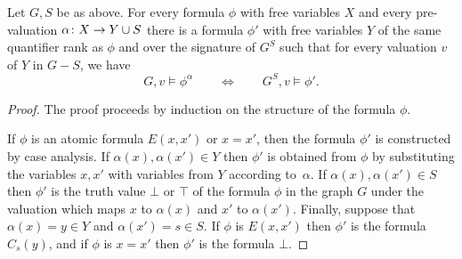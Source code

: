 \begin{lemma}\label{lem:remove-s}Let $G,S$ be as above.	
For every formula $\phi$ with free variables $X$ and every pre-valuation $\alpha\colon X\to Y\cup S$
there is a formula $\phi'$ with free variables $Y$
of the same quantifier rank as $\phi$ and over the signature of $G^S$
 such that for every valuation $v$ of $Y$ in $G-S$, we have
$$G,v\models\phi^{\alpha}\qquad\iff\qquad G^S,v\models\phi'.$$
\end{lemma}
\begin{proof}
The proof proceeds by induction on the structure of the formula $\phi$. 

If $\phi$ is an atomic formula $E(x,x')$ or $x=x'$, then the formula $\phi'$ is constructed by case analysis. If $\alpha(x),\alpha(x')\in Y$ then $\phi'$
is obtained from $\phi$ by substituting the variables $x,x'$ with variables from $Y$ according to~$\alpha$. If  $\alpha(x),\alpha(x')\in S$ then $\phi'$ is the truth value $\bot$ or $\top$ of 
the formula $\phi$ in the graph $G$ under the valuation which maps $x$ to $\alpha(x)$ and $x'$ to $\alpha(x')$. Finally, suppose that $\alpha(x)=y\in Y$ and $\alpha(x')=s\in S$. If $\phi$ is $E(x,x')$ then $\phi'$ is the formula $C_{s}(y)$, and if $\phi$ is $x=x'$ then $\phi'$ is the formula $\bot$.
 
 

%
%






\end{proof}

